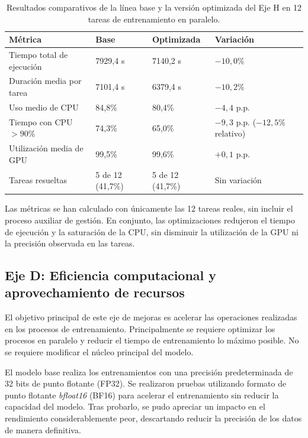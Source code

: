\documentclass[11pt,a4paper,spanish]{book}
\numberwithin{equation}{chapter}
\numberwithin{figure}{chapter}
\begin{document}
\begin{table}[h]
\centering
\small
\setlength{\tabcolsep}{4pt}
\begin{tabular}{|p{4.5cm}|p{2.3cm}|p{2.3cm}|p{3.0cm}|}
\hline
\textbf{Métrica} & \textbf{Base} & \textbf{Optimizada} & \textbf{Variación} \\
\hline
Tiempo total de ejecución & 7929,4 s & 7140,2 s & $-10,0\%$ \\
\hline
Duración media por tarea & 7101,4 s & 6379,4 s & $-10,2\%$ \\
\hline
Uso medio de CPU & 84,8\% & 80,4\% & $-4,4$ p.p. \\
\hline
Tiempo con CPU $>90\%$ & 74,3\% & 65,0\% & $-9,3$ p.p. ($-12,5\%$ relativo) \\
\hline
Utilización media de GPU & 99,5\% & 99,6\% & $+0,1$ p.p. \\
\hline
Tareas resueltas & 5 de 12 (41,7\%) & 5 de 12 (41,7\%) & Sin variación \\
\hline
\end{tabular}
\caption{Resultados comparativos de la línea base y la versión optimizada del Eje H en 12 tareas de entrenamiento en paralelo.}
\label{tab:eje-h-resultados}
\end{table}

\FloatBarrier

Las métricas se han calculado con únicamente las 12 tareas reales, sin incluir el proceso auxiliar de gestión. En conjunto, las optimizaciones
redujeron el tiempo de ejecución y la saturación de la CPU, sin disminuir la utilización de la GPU ni la precisión observada en las tareas.

\subsection{Eje D: Eficiencia computacional y aprovechamiento de recursos}

El objetivo principal de este eje de mejoras es acelerar las operaciones realizadas en los procesos de entrenamiento. Principalmente se requiere
optimizar los procesos en paralelo y reducir el tiempo de entrenamiento lo máximo posible. No se requiere modificar el núcleo principal del modelo.

El modelo base realiza los entrenamientos con una precisión predeterminada de 32 bits de punto flotante (FP32). Se realizaron pruebas utilizando
formato de punto flotante \textit{bfloat16} (BF16) para acelerar el entrenamiento sin reducir la capacidad del modelo. Tras probarlo, se pudo apreciar
un impacto en el rendimiento considerablemente peor, descartando reducir la precisión de los datos de manera definitiva.
\end{document}
